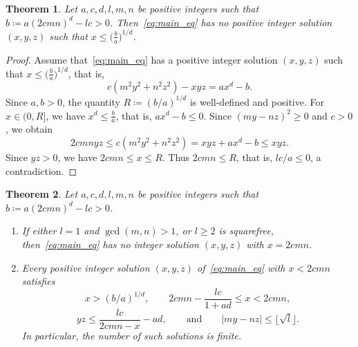 \documentclass[11pt,a4paper]{amsart}
\theoremstyle{plain}
\newtheorem{theorem}{Theorem}[section]
\theoremstyle{definition}
\begin{document}
\begin{theorem}
Let $a, c, d,l, m, n$ be positive integers such that $b \coloneqq a(2cmn)^d - l c>0$. Then~\eqref{eq:main_eq} has no positive integer solution $(x,y,z)$ such that $x\le \big(\frac{b}{a}\big)^{1/d}$.
\end{theorem}
\begin{proof}
Assume that~\eqref{eq:main_eq} has a positive integer solution $(x,y,z)$ such that $x\le \big(\frac{b}{a}\big)^{1/d}$, that is, $$c(m^2y^2 + n^2z^2) - xyz = ax^d -b.$$
Since $a, b > 0$, the quantity $R \coloneqq (b/a)^{1/d}$ is well-defined and positive. For $x \in (0, R]$, we have $x^d \le \frac{b}{a}$, that is, $ax^d - b\le 0$. Since $(my - nz)^2 \ge 0$ and $c> 0$, we obtain
$$2cmn yz \le c(m^2y^2 + n^2z^2) = xyz + ax^d -b \le xyz.$$
Since $yz > 0$, we have $2cmn \le x \le R$. Thus $2cmn \le R$, that is, $lc/a \leq 0$, a contradiction.
\end{proof}
\begin{theorem}\label{positive solutions bound}
Let $a, c, d, l, m, n$ be positive integers such that $b \coloneqq a(2cmn)^{d} - lc > 0$.
\begin{enumerate}[label=(\alph*)]
    \item If either $l = 1$ and $\gcd(m,n) > 1$, or $l \ge 2$ is squarefree, then~\eqref{eq:main_eq} has no integer solution $(x,y,z)$ with $x = 2cmn$.
    \item Every positive integer solution $(x,y,z)$ of~\eqref{eq:main_eq} with $x < 2cmn$ satisfies
    \[
    x > (b/a)^{1/d}, \qquad 2cmn - \frac{lc}{1+ad} \le x < 2cmn,
    \]
    \[
    yz \le \frac{lc}{2cmn - x} - ad, \qquad \text{and} \qquad |my - nz| \le \big\lfloor \sqrt{l} \big\rfloor.
    \]
    In particular, the number of such solutions is finite.
\end{enumerate}
\end{theorem}
\end{document}
